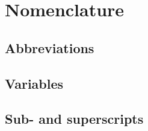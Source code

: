 
\chapter{Nomenclature}%
\label{nomenclature}

\section*{Abbreviations}

\section*{Variables}

	
\section*{Sub- and superscripts}


